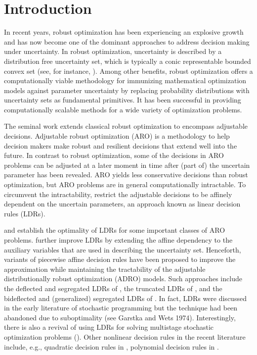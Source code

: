 \documentclass[fleqn,isre,blindrev]{informs4}
\begin{document}
\maketitle
	
\section{Introduction}
\noindent In recent years, robust optimization has been experiencing an explosive growth and has now become one of the dominant approaches to address decision making under uncertainty. In robust optimization, uncertainty is described by a distribution free uncertainty set, which is typically a conic representable bounded convex set (see, for instance, \cite{gl97,gol98,bn98,bn99,bn00,bs04,bb09,bbc11}). Among other benefits, robust optimization offers a computationally viable methodology for immunizing mathematical optimization models against parameter uncertainty by\vadjust{\pagebreak} replacing probability distributions with uncertainty sets as fundamental primitives. It has been successful in providing computationally scalable methods for a wide variety of optimization problems. 
	
	The seminal work \cite{bggn04} extends classical robust optimization to encompass adjustable decisions.  {Adjustable robust optimization (ARO) is a methodology to help decision makers make robust and resilient decisions that extend well into the future. In contrast to robust optimization, some of the decisions in ARO problems can be adjusted at a later moment in time after (part of) the uncertain parameter has been revealed. ARO yields less conservative decisions than robust optimization, but ARO problems} are in general computationally intractable. To circumvent the intractability, \cite{bggn04} restrict the adjustable decisions to be affinely dependent on the uncertain parameters, an approach known as linear decision rules (LDRs). 
	
	\cite{bip10,iss13} and \cite{bg12} establish the optimality of LDRs for some important classes of ARO problems. \cite{cz09} further improve LDRs by extending the affine dependency to the auxiliary variables that are used in describing the uncertainty set. Henceforth, variants of piecewise affine decision rules have been proposed to improve the approximation while maintaining the tractability of the adjustable distributionally robust optimization (ADRO) models. Such approaches include the deflected and segregated LDRs of \cite{cssz08}, the truncated LDRs of \cite{ss09}, and the bideflected and (generalized) segregated LDRs of \cite{gs10}. In fact, LDRs were discussed in the early literature of stochastic programming but the technique had been abandoned due to suboptimality (see Garstka and Wets 1974). Interestingly, there is also a revival of using LDRs for solving multistage stochastic optimization problems (\cite{kwg11}). Other nonlinear decision rules in the recent literature include, e.g., quadratic decision rules in \cite{ben09}, polynomial decision rules in \cite{bip11}.
	
\end{document}
